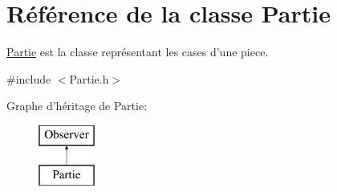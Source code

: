 \hypertarget{classPartie}{\section{\-Référence de la classe \-Partie}
\label{classPartie}
}


\hyperlink{classPartie}{\-Partie} est la classe représentant les cases d'une piece.  




{\ttfamily \#include $<$\-Partie.\-h$>$}

\-Graphe d'héritage de \-Partie\-:\begin{figure}[H]
\begin{center}
\leavevmode
\includegraphics[height=2.000000cm]{classPartie}
\end{center}
\end{figure}
